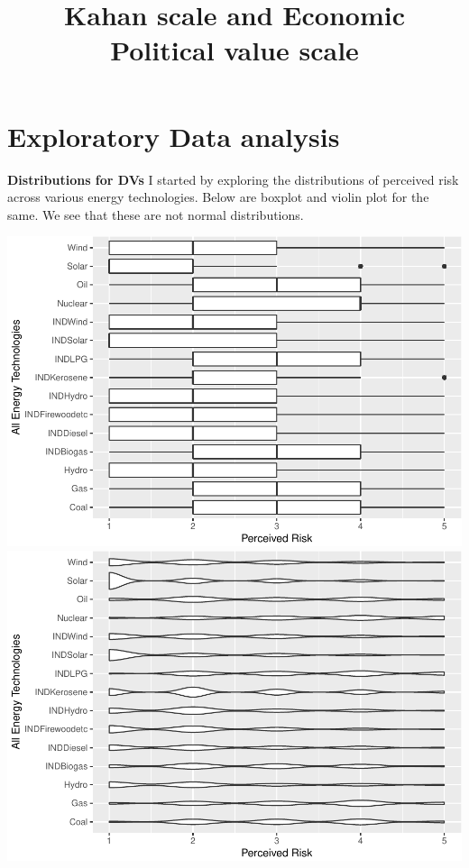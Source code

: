 \documentclass[
]{article}
\title{Kahan scale and Economic Political value scale}
\author{}
\date{\vspace{-2.5em}}
\begin{document}
\maketitle

{
\setcounter{tocdepth}{2}
\tableofcontents
}
\newpage

\hypertarget{exploratory-data-analysis}{%
\section{Exploratory Data analysis}\label{exploratory-data-analysis}}

\textbf{Distributions for DVs} I started by exploring the distributions
of perceived risk across various energy technologies. Below are boxplot
and violin plot for the same. We see that these are not normal
distributions.

\includegraphics{Significant_results_files/figure-latex/unnamed-chunk-5-1.pdf}
\includegraphics{Significant_results_files/figure-latex/unnamed-chunk-5-2.pdf}
\end{document}
